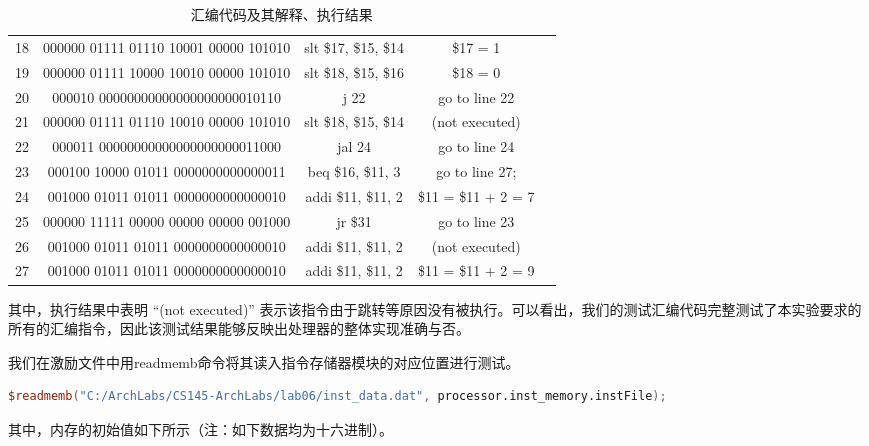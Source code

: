 \documentclass{cumcm}
\numberwithin{equation}{section}
\numberwithin{equation}{subsection}
\begin{document}
\begin{table}[htbp]
\begin{tabular}{|c|c|c|c|c|}
        18 & 000000 01111 01110 10001 00000 101010 & slt \$17, \$15, \$14 & \$17 = 1\\
        19 & 000000 01111 10000 10010 00000 101010 & slt \$18, \$15, \$16 & \$18 = 0\\
        20 & 000010 00000000000000000000010110 & j 22 & go to line 22\\
        21 & 000000 01111 01110 10010 00000 101010 & slt \$18, \$15, \$14 & (not executed) \\
        22 & 000011 00000000000000000000011000 & jal 24 & go to line 24\\
        23 & 000100 10000 01011 0000000000000011 & beq \$16, \$11, 3 & go to line 27;\\
        24 & 001000 01011 01011 0000000000000010 & addi \$11, \$11, 2 & \$11 = \$11 + 2 = 7\\
        25 & 000000 11111 00000 00000 00000 001000 & jr \$31 & go to line 23\\
        26 & 001000 01011 01011 0000000000000010 & addi \$11, \$11, 2 & (not executed)\\
        27 & 001000 01011 01011 0000000000000010 & addi \$11, \$11, 2 & \$11 = \$11 + 2 = 9\\
        \hline
    \end{tabular}
    \caption{汇编代码及其解释、执行结果}
    \label{tab3}
\end{table}

其中，执行结果中表明 “(not executed)” 表示该指令由于跳转等原因没有被执行。可以看出，我们的测试汇编代码完整测试了本实验要求的所有的汇编指令，因此该测试结果能够反映出处理器的整体实现准确与否。

我们在激励文件中用readmemb命令将其读入指令存储器模块的对应位置进行测试。
\begin{lstlisting}[language=verilog]
$readmemb("C:/ArchLabs/CS145-ArchLabs/lab06/inst_data.dat", processor.inst_memory.instFile);
\end{lstlisting}

其中，内存的初始值如下所示（注：如下数据均为十六进制）。
\end{document}

